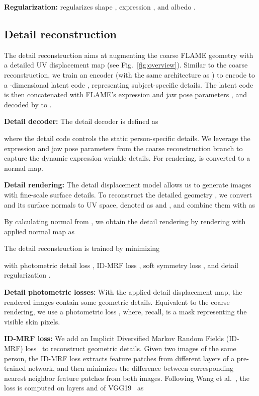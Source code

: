 \documentclass[final]{cvpr}
\newcommand{\qheading}[1]{\noindent\textbf{#1}}
\begin{document}
\qheading{Regularization:}
 regularizes shape , expression , and albedo .



\subsection{Detail reconstruction} 

The detail reconstruction aims at augmenting the coarse FLAME geometry with a detailed UV displacement map  (see Fig.~\ref{fig:overview}).
Similar to the coarse reconstruction, we train an encoder  (with the same architecture as ) to encode  to a -dimensional latent code , representing subject-specific details.
The latent code  is then concatenated with FLAME's expression  and jaw pose parameters , and decoded by  to . 

\qheading{Detail decoder: }
The detail decoder is defined as

where the detail code  controls the static person-specific details.
We leverage the expression  and jaw pose parameters  from the coarse reconstruction branch to capture the dynamic expression wrinkle details.
For rendering,  is converted to a normal map. 

\qheading{Detail rendering:}
The detail displacement model allows us to generate images with fine-scale surface details. 
To reconstruct the detailed geometry , we convert  and its surface normals  to UV space, denoted as  and , and combine them with  as

By calculating normal  from , we obtain the detail rendering  by rendering  with applied normal map as


The detail reconstruction is trained by minimizing

with photometric detail loss , ID-MRF loss , soft symmetry loss , and detail regularization .

\qheading{Detail photometric losses:}
With the applied detail displacement map, the rendered images  contain some geometric details.
Equivalent to the coarse rendering, we use a photometric loss , where, recall,  is a mask representing the visible skin pixels.

\qheading{ID-MRF loss:}
We add an Implicit Diversified Markov Random Fields (ID-MRF) loss~\cite{Wang2018} to reconstruct geometric details.
Given two images of the same person, the ID-MRF loss extracts feature patches from different layers of a pre-trained network, and then minimizes the difference between corresponding nearest neighbor feature patches from both images. 
Following Wang et al.~\cite{Wang2018}, the loss is computed on layers  and  of VGG19~\cite{Simonyan2014VeryDC} as
\end{document}
